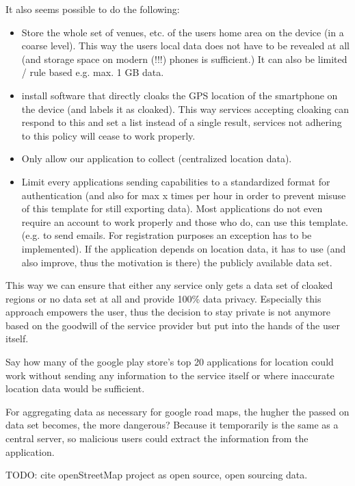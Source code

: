 It also seems possible to do the following: 
\begin{itemize}
	\item Store the whole set of venues, etc. of the users home area on the device (in a coarse level). This way the users local data does not have to be revealed at all (and storage space on modern (!!!) phones is sufficient.) It can also be limited / rule based e.g. max. 1 GB data.
	\item install software that directly cloaks the GPS location of the smartphone on the device (and labels it as cloaked). This way services accepting cloaking can respond to this and set a list instead of a single result, services not adhering to this policy will cease to work properly.
	\item Only allow our application to collect (centralized location data).
	\item Limit every applications sending capabilities to a standardized format for authentication (and also for max x times per hour in order to prevent misuse of this template for still exporting data). Most applications do not even require an account to work properly and those who do, can use this template. (e.g. to send emails. For registration purposes an exception has to be implemented). If the application depends on location data, it has to use (and also improve, thus the motivation is there) the publicly available data set.
\end{itemize}
This way we can ensure that either any service only gets a data set of cloaked regions or no data set at all and provide 100\% data privacy. Especially this approach empowers the user, thus the decision to stay private is not anymore based on the goodwill of the service provider but put into the hands of the user itself.

Say how many of the google play store's top 20 applications for location could work without sending any information to the service itself or where inaccurate location data would be sufficient.

For aggregating data as necessary for google road maps, the hugher the passed on data set becomes, the more dangerous? Because it temporarily is  the same as a central server, so malicious users could extract the information from the application.


TODO: cite openStreetMap project as open source, open sourcing data.